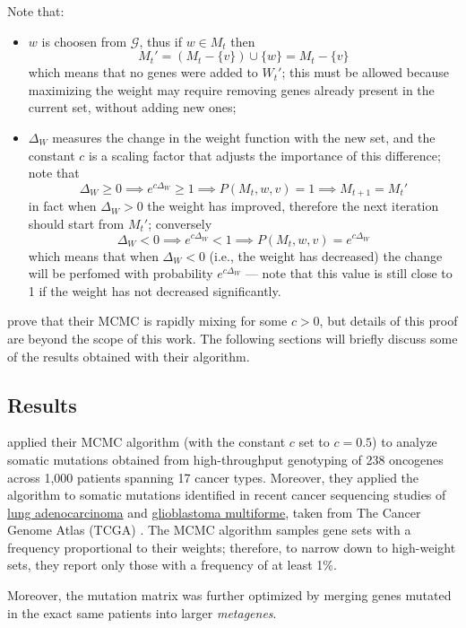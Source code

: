 Note that:

\begin{itemize}
    \item $w$ is choosen from $\mathcal G$, thus if $w \in M_t$ then $$M_t' = (M_t - \{v\}) \cup \{w\} = M_t - \{v\}$$ which means that no genes were added to $W_t'$; this must be allowed because maximizing the weight may require removing genes already present in the current set, without adding new ones;
    \item $\Delta_W$ measures the change in the weight function with the new set, and the constant $c$ is a scaling factor that adjusts the importance of this difference; note that $$\Delta_W \ge 0 \implies e^{c \Delta_W} \ge 1 \implies P(M_t, w, v) = 1 \implies M_{t + 1} = M_t'$$ in fact when $\Delta_W > 0$ the weight has improved, therefore the next iteration should start from $M_t'$; conversely $$\Delta_W < 0 \implies e^{c \Delta_W} < 1 \implies P(M_t, w, v) = e ^{c \Delta_W}$$ which means that when $\Delta_W < 0$ (i.e., the weight has decreased) the change will be perfomed with probability $e^{c \Delta_W}$ --- note that this value is still close to 1 if the weight has not decreased significantly.
\end{itemize}

\textcite{dendrix} prove that their MCMC is rapidly mixing for some $c > 0$, but details of this proof are beyond the scope of this work. The following sections will briefly discuss some of the results obtained with their algorithm.

\subsection{Results}

\textcite{dendrix} applied their MCMC algorithm (with the constant $c$ set to $c = 0.5$) to analyze somatic mutations obtained from high-throughput genotyping of 238 oncogenes across 1,000 patients spanning 17 cancer types. Moreover, they applied the algorithm to somatic mutations identified in recent cancer sequencing studies of \href{https://en.wikipedia.org/wiki/Adenocarcinoma_of_the_lung}{lung adenocarcinoma} and \href{https://en.wikipedia.org/wiki/Glioblastoma}{glioblastoma multiforme}, taken from The Cancer Genome Atlas (TCGA) \cite{tcga}. The MCMC algorithm samples gene sets with a frequency proportional to their weights; therefore, to narrow down to high-weight sets, they report only those with a frequency of at least 1\%.

Moreover, the mutation matrix was further optimized by merging genes mutated in the exact same patients into larger \textit{metagenes}. 

